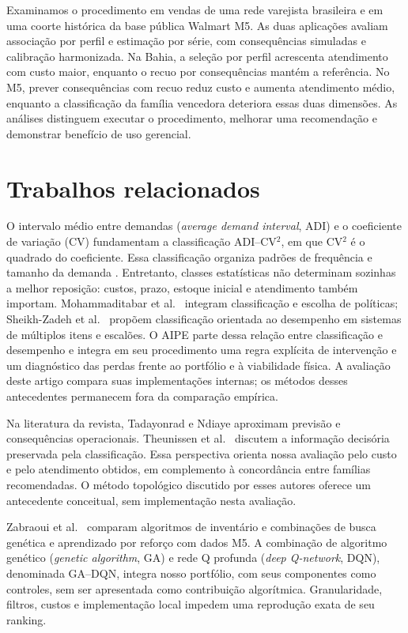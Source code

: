 \documentclass[preprint,12pt]{elsarticle}
\begin{document}
Examinamos o procedimento em vendas de uma rede varejista brasileira e em uma coorte histórica da base pública Walmart M5. As duas aplicações avaliam associação por perfil e estimação por série, com consequências simuladas e calibração harmonizada. Na Bahia, a seleção por perfil acrescenta atendimento com custo maior, enquanto o recuo por consequências mantém a referência. No M5, prever consequências com recuo reduz custo e aumenta atendimento médio, enquanto a classificação da família vencedora deteriora essas duas dimensões. As análises distinguem executar o procedimento, melhorar uma recomendação e demonstrar benefício de uso gerencial.

\section{Trabalhos relacionados}
O intervalo médio entre demandas (\textit{average demand interval}, ADI) e o coeficiente de variação (CV) fundamentam a classificação ADI--CV$^2$, em que CV$^2$ é o quadrado do coeficiente. Essa classificação organiza padrões de frequência e tamanho da demanda \cite{syntetos2005}. Entretanto, classes estatísticas não determinam sozinhas a melhor reposição: custos, prazo, estoque inicial e atendimento também importam. Mohammaditabar et al.\ \cite{Mohammaditabar2012Integrated} integram classificação e escolha de políticas; Sheikh-Zadeh et al.\ \cite{SheikhZadeh2021PBIC} propõem classificação orientada ao desempenho em sistemas de múltiplos itens e escalões. O AIPE parte dessa relação entre classificação e desempenho e integra em seu procedimento uma regra explícita de intervenção e um diagnóstico das perdas frente ao portfólio e à viabilidade física. A avaliação deste artigo compara suas implementações internas; os métodos desses antecedentes permanecem fora da comparação empírica.

Na literatura da revista, Tadayonrad e Ndiaye \cite{sca_f81ad2b3e023} aproximam previsão e consequências operacionais. Theunissen et al.\ \cite{sca_c5c06dcbc9e5} discutem a informação decisória preservada pela classificação. Essa perspectiva orienta nossa avaliação pelo custo e pelo atendimento obtidos, em complemento à concordância entre famílias recomendadas. O método topológico discutido por esses autores oferece um antecedente conceitual, sem implementação nesta avaliação.

Zabraoui et al.\ \cite{sca_27e994c54848} comparam algoritmos de inventário e combinações de busca genética e aprendizado por reforço com dados M5. A combinação de algoritmo genético (\textit{genetic algorithm}, GA) e rede Q profunda (\textit{deep Q-network}, DQN), denominada GA--DQN, integra nosso portfólio, com seus componentes como controles, sem ser apresentada como contribuição algorítmica. Granularidade, filtros, custos e implementação local impedem uma reprodução exata de seu ranking.
\end{document}

